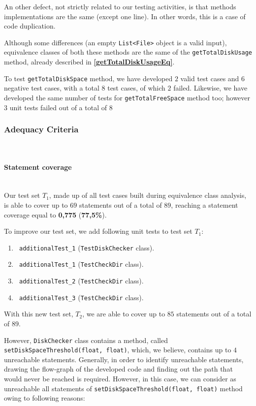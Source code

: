 \documentclass[sigconf]{acmart}
\begin{document}
An other defect, not strictly related to our testing activities, is that methods implementations are the same (except one line). In other words, this is a case of code duplication. 

Although some differences (an empty \texttt{List<File>} object is a valid input), equivalence classes of both these methods are the same of the \texttt{getTotalDiskUsage} method, already described in \textbf{\ref{getTotalDiskUsageEq}}. 

To test \texttt{getTotalDiskSpace} method, we have developed $2$ valid test cases and $6$ negative test cases, with a total $8$ test cases, of which $2$ failed. Likewise, we have developed the same number of tests for \texttt{getTotalFreeSpace} method too; however $3$ unit tests failed out of a total of $8$

\subsubsection{Adequacy Criteria}
\hfill\\

\paragraph{Statement coverage}
\hfill\\

Our test set $T_1$, made up of all test cases built during equivalence class analysis, is able to cover up to $69$ statements out of a total of $89$, reaching a statement coverage equal to \textbf{0,775} (\textbf{77,5\%}).

To improve our test set, we add following unit tests to test set $T_1$:
\begin{enumerate}
\item\texttt{ additionalTest\_1} (\texttt{TestDiskChecker} class).
\item\texttt{ additionalTest\_1} (\texttt{TestCheckDir} class).
\item\texttt{ additionalTest\_2} (\texttt{TestCheckDir} class).
\item\texttt{ additionalTest\_3} (\texttt{TestCheckDir} class).
\end{enumerate}

With this new test set, $T_2$, we are able to cover up to $85$ statements out of a total of $89$.

However, \texttt{DiskChecker} class contains a method, called \texttt{set\-Disk\-SpaceThreshold(float, float)}, which, we believe, contains up to $4$ unreachable statements. Generally, in order to identify unreachable statements, drawing the flow-graph of the developed code and finding out the path that would never be reached is required. However, in this case, we can consider as unreachable all statements of \texttt{setDiskSpaceThreshold(float, float)} method owing to following reasons:
\end{document}
